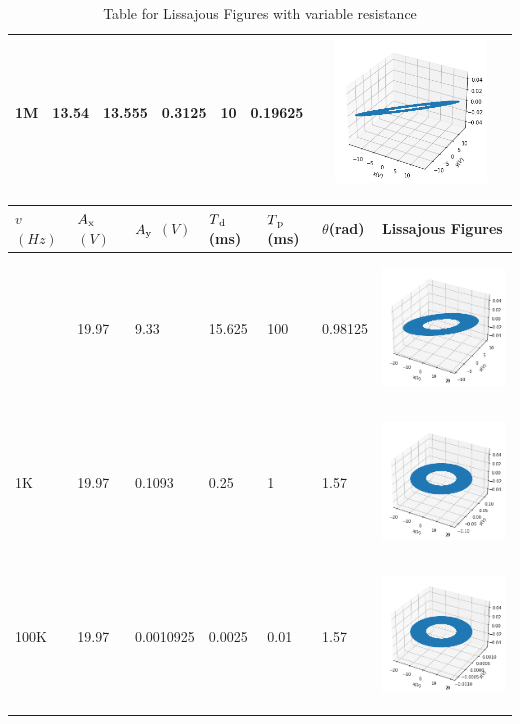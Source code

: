 \documentclass{article}
\begin{document}
\begin{table}[!htp]
\begin{tabular}{  >{\raggedright}m{1cm}  m{1.5cm}  m{1.5cm} m{1.5cm} m{1.5cm} m{1.5cm} m{5cm}  }
\midrule\addlinespace[1.5ex]
        1M &13.54 &13.555 &0.3125 &10 &0.19625
        & \includegraphics[height=1.5in, width=2in]{5.png} \\
\bottomrule
    \end{tabular}

    \caption{Table for Lissajous Figures with variable resistance}
    \label{table4.2}
\end{table}
\newpage
\begin{table}[!htp] 
\centering 

\begin{tabular}{  >{\raggedright}m{1cm}  m{1.5cm}  m{1.5cm} m{1.5cm} m{1.5cm} m{1.5cm} m{5cm}  }      %
\toprule                                   %
$v$ $(Hz)$  & $A\textsubscript{x}$ $(V)$ & $A\textsubscript{y}$ $(V)$ & $T\textsubscript{d}$(ms) & $T\textsubscript{p}$(ms) & $\theta$(rad) & Lissajous Figures \\  %
\midrule\addlinespace[1.5ex]
        10 &19.97 &9.33 &15.625 &100 &0.98125
        & \includegraphics[height=1.5in, width=2in]{6.png} \\
\midrule\addlinespace[1.5ex]
        1K &19.97 &0.1093 &0.25 &1 &1.57 
        & \includegraphics[height=1.5in, width=2in]{7.png} \\
\midrule\addlinespace[1.5ex]
        100K &19.97 &0.0010925 &0.0025 &0.01 &1.57
        & \includegraphics[height=1.5in, width=2in]{8.png} \\


\end{tabular}
\end{table}
\end{document}

